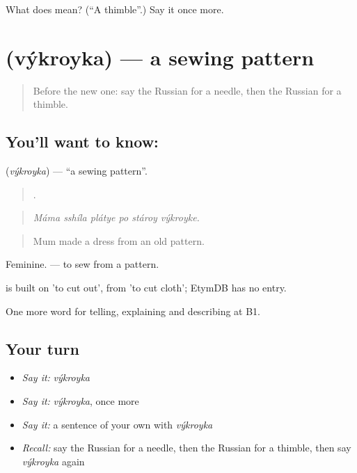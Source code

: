 \begin{tcolorbox}[breakable,colback=teal!4,colframe=teal!35!black,title={Before you move on}]
What does  mean? (\textquotedblleft{}A thimble\textquotedblright{}.) Say it once more.
\end{tcolorbox}
\section[\texorpdfstring{\ru{выкройка} (výkroyka)}{выкройка (výkroyka)}]{ (výkroyka) — a sewing pattern}

\label{lesson:RU-C501-vykroyka}



\begin{quote}
Before the new one: say the Russian for a needle, then the Russian for a thimble.
\end{quote}

\subsection*{You'll want to know: }
\textbf{} (\emph{výkroyka}) — \textquotedblleft{}a sewing pattern\textquotedblright{}.

\begin{quote}
     .
\end{quote}

\begin{quote}
\emph{Máma sshíla plátye po stároy výkroyke.}
\end{quote}

\begin{quote}
Mum made a dress from an old pattern.
\end{quote}

Feminine. \emph{  } — to sew from a pattern.

\begin{cousinweb}
\emph{} is built on \emph{} 'to cut out', from \emph{} 'to cut cloth'; EtymDB has no entry.
\end{cousinweb}

\begin{grammarlens}[title={What you've built}]
One more word for telling, explaining and describing at B1.
\end{grammarlens}

\subsection*{Your turn}
\begin{itemize}
\raggedright
  \item \emph{Say it:} \emph{výkroyka}
  \item \emph{Say it:} \emph{výkroyka}, once more
  \item \emph{Say it:} a sentence of your own with \emph{výkroyka}
  \item \emph{Recall:} say the Russian for a needle, then the Russian for a thimble, then say \emph{výkroyka} again
\end{itemize}

